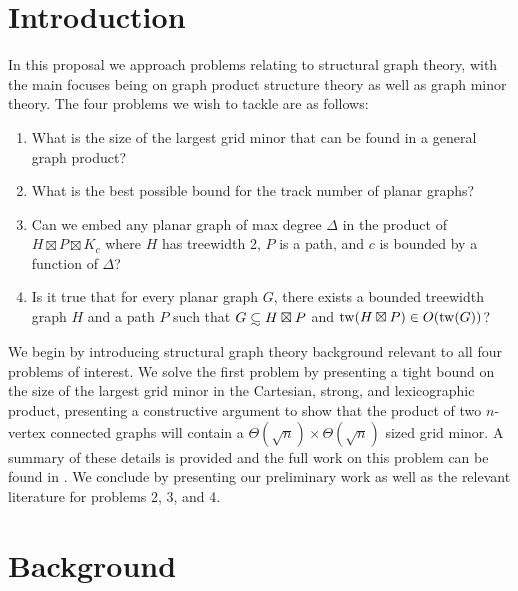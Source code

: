 \documentclass[../main.tex]{subfiles}
\begin{document}
\section{Introduction}
In this proposal we approach problems relating to structural graph theory, with the main focuses being on graph product structure theory as well as graph minor theory. The four problems we wish to tackle are as follows:
\begin{enumerate}
	\item What is the size of the largest grid minor that can be found in a general graph product?
	\item What is the best possible bound for the track number of planar graphs?
	\item Can we embed any planar graph of max degree $\Delta$ in the product of $H\boxtimes P\boxtimes K_c$ where $H$ has treewidth 2, $P$ is a path, and $c$ is bounded by a function of $\Delta$?
	\item Is it true that for every planar graph $G$, there exists a bounded treewidth graph $H$ and a path $P$ such that $G \subsetsim H\boxtimes P$ and $\operatorname{tw}(H\boxtimes P) \in O(\operatorname{tw}(G))$? 
\end{enumerate}
We begin by introducing structural graph theory background relevant to all four problems of interest. We solve the first problem by presenting a tight bound on the size of the largest grid minor in the Cartesian, strong, and lexicographic product, presenting a constructive argument to show that the product of two $n$-vertex connected graphs will contain a $\Theta(\sqrt{n})\times\Theta(\sqrt{n})$ sized grid minor. A summary of these details is provided and the full work on this problem can be found in \cite{DMWW24}. We conclude by presenting our preliminary work as well as the relevant literature for problems 2, 3, and 4.

\section{Background}
\end{document}
